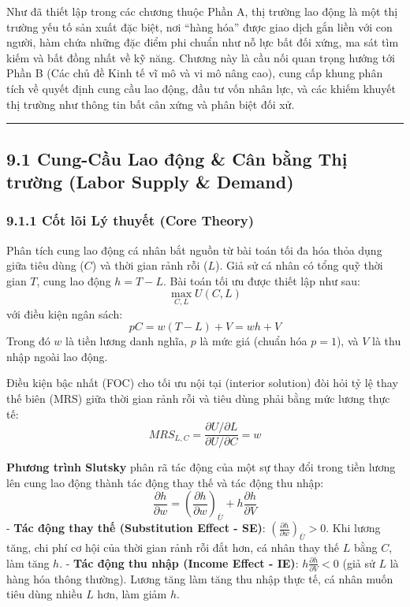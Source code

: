 \documentclass[
]{article}
\begin{document}
Như đã thiết lập trong các chương thuộc Phần A, thị trường lao động là
một thị trường yếu tố sản xuất đặc biệt, nơi ``hàng hóa'' được giao dịch
gắn liền với con người, hàm chứa những đặc điểm phi chuẩn như nỗ lực bất
đối xứng, ma sát tìm kiếm và bất đồng nhất về kỹ năng. Chương này là cầu
nối quan trọng hướng tới Phần B (Các chủ đề Kinh tế vĩ mô và vi mô nâng
cao), cung cấp khung phân tích về quyết định cung cầu lao động, đầu tư
vốn nhân lực, và các khiếm khuyết thị trường như thông tin bất cân xứng
và phân biệt đối xử.

\begin{center}\rule{0.5\linewidth}{0.5pt}\end{center}

\subsection{9.1 Cung-Cầu Lao động \& Cân bằng Thị trường (Labor Supply
\&
Demand)}\label{cung-cux1ea7u-lao-ux111ux1ed9ng-cuxe2n-bux1eb1ng-thux1ecb-trux1b0ux1eddng-labor-supply-demand}

\subsubsection{9.1.1 Cốt lõi Lý thuyết (Core
Theory)}\label{cux1ed1t-luxf5i-luxfd-thuyux1ebft-core-theory-32}

Phân tích cung lao động cá nhân bắt nguồn từ bài toán tối đa hóa thỏa
dụng giữa tiêu dùng (\(C\)) và thời gian rảnh rỗi (\(L\)). Giả sử cá
nhân có tổng quỹ thời gian \(T\), cung lao động \(h = T - L\). Bài toán
tối ưu được thiết lập như sau: \[ \max_{C, L} U(C, L) \] với điều kiện
ngân sách: \[ pC = w(T - L) + V = wh + V \] Trong đó \(w\) là tiền lương
danh nghĩa, \(p\) là mức giá (chuẩn hóa \(p=1\)), và \(V\) là thu nhập
ngoài lao động.

Điều kiện bậc nhất (FOC) cho tối ưu nội tại (interior solution) đòi hỏi
tỷ lệ thay thế biên (MRS) giữa thời gian rảnh rỗi và tiêu dùng phải bằng
mức lương thực tế:
\[ MRS_{L,C} = \frac{\partial U / \partial L}{\partial U / \partial C} = w \]

\textbf{Phương trình Slutsky} phân rã tác động của một sự thay đổi trong
tiền lương lên cung lao động thành tác động thay thế và tác động thu
nhập:
\[ \frac{\partial h}{\partial w} = \left( \frac{\partial h}{\partial w} \right)_{\bar{U}} + h \frac{\partial h}{\partial V} \]
- \textbf{Tác động thay thế (Substitution Effect - SE)}:
\(\left( \frac{\partial h}{\partial w} \right)_{\bar{U}} > 0\). Khi
lương tăng, chi phí cơ hội của thời gian rảnh rỗi đắt hơn, cá nhân thay
thế \(L\) bằng \(C\), làm tăng \(h\). - \textbf{Tác động thu nhập
(Income Effect - IE)}: \(h \frac{\partial h}{\partial V} < 0\) (giả sử
\(L\) là hàng hóa thông thường). Lương tăng làm tăng thu nhập thực tế,
cá nhân muốn tiêu dùng nhiều \(L\) hơn, làm giảm \(h\).
\end{document}
